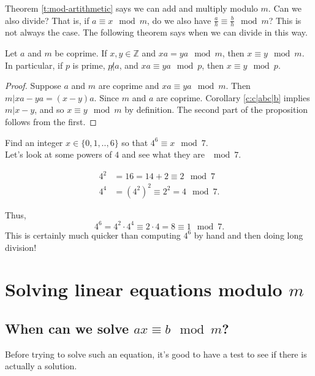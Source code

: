 \documentclass[11pt,dvipsnames]{book}
\numberwithin{equation}{section} %
\numberwithin{figure}{section} %
\numberwithin{table}{section} %
\begin{document}
\begin{exercise}
Theorem \ref{t:mod-artithmetic} says we can add and multiply modulo $m$. Can we also divide? That is, if $a\equiv x\mod m$, do we also have $\frac{a}{h}\equiv \frac{b}{h}\mod m$? This is not always the case. The following theorem says when we can divide in this way. 

\begin{proposition}
\label{p:xa=ya-x=a}
Let $a$ and $m$ be coprime. If $x,y\in \mathbb{Z}$ and $xa=ya\mod m$, then $x\equiv y\mod m$. In particular, if $p$ is prime,  $p\not|a$, and $xa\equiv ya\mod p$, then $x\equiv y\mod p$. 
\end{proposition}

\begin{proof}
Suppose $a$ and $m$ are coprime and $xa\equiv ya\mod m$. Then $m|xa-ya=(x-y)a$. Since $m$ and $a$ are coprime. Corollary \ref{c:c|abc|b} implies $m|x-y$, and so $x\equiv y\mod m$ by definition. The second part of the proposition follows from the first.
\end{proof}




\begin{example}
Find an integer $x\in \{0,1,..,6\}$ so that $4^{6}\equiv x\mod 7$. \\

Let's look at some powers of $4$ and see what they are $\mod 7$. 

\begin{align*}
4^2 & = 16 =14+2\equiv 2 \mod 7 \\
4^4 & = (4^2)^2 \equiv 2^2 =4 \mod 7.
\end{align*}


Thus,
\[
4^6=4^2\cdot 4^4\equiv 2\cdot 4=8\equiv 1 \mod 7.
\]
This is certainly much quicker than computing $4^6$ by hand and then doing long division!
\end{example}



\section{Solving linear equations modulo $m$}


\subsection{When can we solve $ax\equiv b\mod m$?}

Before trying to solve such an equation, it's good to have a test to see if there is actually a solution.


\end{exercise}
\end{document}
